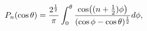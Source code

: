 \[\mathop{P_{n}\/}\nolimits\!\left(\mathop{\cos\/}\nolimits\theta\right)=\frac{2%
^{\frac{1}{2}}}{\pi}\int_{0}^{\theta}\frac{\mathop{\cos\/}\nolimits\!\left((n+%
\tfrac{1}{2})\phi\right)}{(\mathop{\cos\/}\nolimits\phi-\mathop{\cos\/}%
\nolimits\theta)^{\frac{1}{2}}}d\phi,\]
